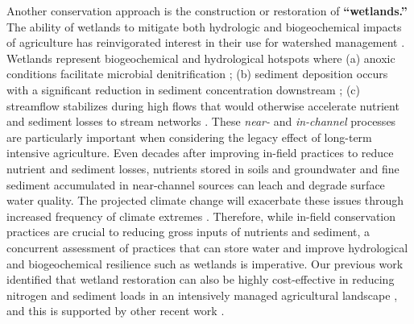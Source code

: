 \documentclass[12pt, class=article, crop=false]{standalone}
\begin{document}
Another conservation approach is the construction or restoration of \textbf{``wetlands.''}
The ability of wetlands to mitigate both hydrologic and biogeochemical impacts of agriculture has reinvigorated interest in their use for watershed management \citep{hansen_contribution_2018, hansen_integrated_2021}. Wetlands represent biogeochemical and hydrological hotspots where (a) anoxic conditions facilitate microbial denitrification \citep{johnston_sediment_1991, hansen_contribution_2018}; (b) sediment deposition occurs with a significant reduction in sediment concentration downstream \citep{johnston_sediment_1991}; (c) streamflow stabilizes during high flows that would otherwise accelerate nutrient and sediment losses to stream networks \citep{mitchell_reducing_2018}.
These \textit{near-} and \textit{in-channel} processes are particularly important when considering the legacy effect of long-term intensive agriculture.
Even decades after improving in-field practices to reduce nutrient and sediment losses, nutrients stored in soils and groundwater \citep{van_meter_legacy_2018} and fine sediment accumulated in near-channel sources \citep{schottler_twentieth_2014} can leach and degrade surface water quality.
The projected climate change will exacerbate these issues through increased frequency of climate extremes \citep{loecke_weather_2017, ballard_long-term_2019, hirabayashi_global_2013}. 
Therefore, while in-field conservation practices are crucial to reducing gross inputs of nutrients and sediment, a concurrent assessment of practices that can store water and improve hydrological and biogeochemical resilience such as wetlands is imperative.
Our previous work identified that wetland restoration can also be highly cost-effective in reducing nitrogen and sediment loads in an intensively managed agricultural landscape \citep{hansen_integrated_2021}, and this is supported by other recent work \citep{cheng_maximizing_2020, evenson_river_2023}.
\end{document}
